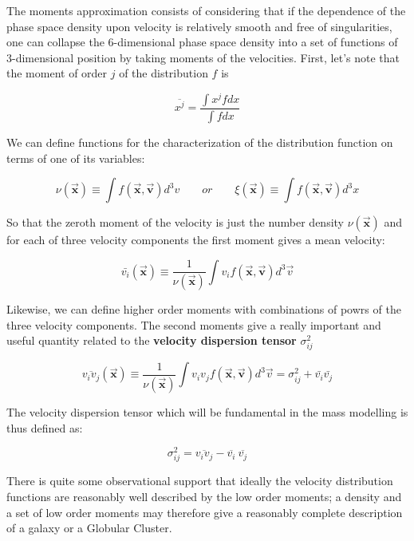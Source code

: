 The moments approximation consists of considering that if the dependence of the phase space density upon velocity is relatively smooth and free of singularities, one can collapse the 6-dimensional phase space density into a set of functions of 3-dimensional position by taking moments of the velocities. First, let's note that the moment of order $j$ of the distribution $f$ is

\begin{equation}
\overline{x^{j}}=\frac {\int x^{j}fdx}{\int fdx}
\end{equation}

We can define functions for the characterization of the distribution function on terms of one of its variables:

\begin{equation}
\nu(\vec{\textbf{x}})\equiv \int f(\vec{\textbf{x}},\vec{\textbf{v}})d^{3}v\quad\quad or \quad\quad  \xi(\vec{\textbf{x}})\equiv \int f(\vec{\textbf{x}},\vec{\textbf{v}})d^{3}x
\end{equation}

So that the zeroth moment of the velocity is just the number density $\nu(\vec{\textbf{x}})$ and for each of three velocity components the first moment gives a mean velocity:

\begin{equation}
\bar{v_{i}}(\vec{\textbf{x}})\equiv \frac{1}{\nu(\vec{\textbf{x}})}\int v_{i}f(\vec{\textbf{x}},\vec{\textbf{v}})d^{3}\vec{v}
\end{equation}

Likewise, we can define higher order moments with combinations of powrs of the three velocity components. The second moments give a really important and useful quantity related to the \textbf{velocity dispersion tensor} $\sigma^{2}_{ij}$

\begin{equation}
\overline{v_{i}v_{j}}(\vec{\textbf{x}})\equiv \frac{1}{\nu(\vec{\textbf{x}})}\int v_{i}v_{j}f(\vec{\textbf{x}},\vec{\textbf{v}})d^{3}\vec{v}=\sigma^{2}
_{ij}+\bar{v_{i}}\bar{v_{j}}
\end{equation}

The velocity dispersion tensor which will be fundamental in the mass modelling is thus defined as:

\begin{equation}
\sigma_{ij}^{2}=\overline{v_{i}v_{j}}-\overline{v_{i}}\:\overline{v_{j}}
\end{equation}

There is quite some observational support that ideally the velocity distribution functions are reasonably well described by the low order moments; a density and a set of low order moments may therefore give a reasonably complete description of a galaxy or a Globular Cluster. 

